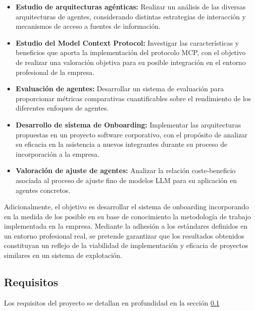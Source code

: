 \begin{itemize}
  \item\textbf{Estudio de arquitecturas agénticas: }Realizar un análisis de las diversas arquitecturas de agentes, considerando distintas estrategias de interacción y mecanismos de acceso a fuentes de información.
  \item\textbf{Estudio del Model Context Protocol: }Investigar las características y beneficios que aporta la implementación del protocolo MCP, con el objetivo de realizar una valoración objetiva para su posible integración en el entorno profesional de la empresa.
  \item\textbf{Evaluación de agentes: }Desarrollar un sistema de evaluación para proporcionar métricas comparativas cuantificables sobre el rendimiento de los diferentes enfoques de agentes. 
  \item\textbf{Desarrollo de sistema de Onboarding: }Implementar las arquitecturas propuestas en un proyecto software corporativo, con el propósito de analizar su eficacia en la asistencia a nuevos integrantes durante su proceso de incorporación a la empresa.
  \item\textbf{Valoración de ajuste de agentes: }Analizar la relación coste-beneficio asociada al proceso de ajuste fino de modelos LLM para su aplicación en agentes concretos.
\end{itemize}

Adicionalmente, el objetivo es desarrollar el sistema de onboarding incorporando en la medida de los posible en su base de conocimiento la metodología de trabajo implementada en la empresa. Mediante la adhesión a los estándares definidos en un entorno profesional real, se pretende garantizar que los resultados obtenidos constituyan un reflejo de la viabilidad de implementación y eficacia de proyectos similares en un sistema de explotación. 

\subsection{Requisitos}
Los requisitos del proyecto se detallan en profundidad en la sección \ref{}
